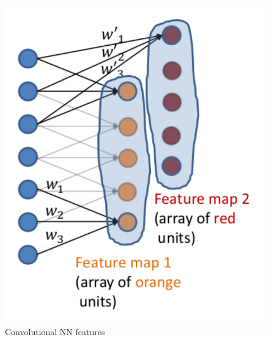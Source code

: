 \documentclass[12pt]{report}
\theoremstyle{plain}
\begin{document}
\begin{flushleft}
\begin{figure}[!h]
	\includegraphics[scale=0.8]{images/convNN_multfeat.pdf}
	\caption{Convolutional NN features} 
	\label{fig:convNN_feat}	
\end{figure}

\newpage


\end{flushleft}
\end{document}
